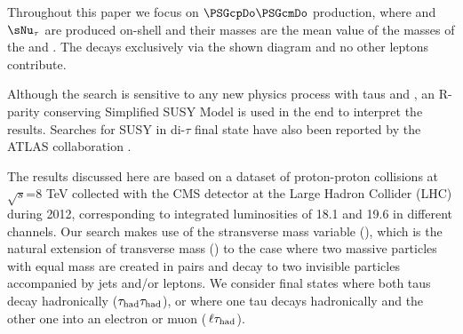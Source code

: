 Throughout this paper we focus on $\PSGcpDo\PSGcmDo$ production, where \sTau and $\sNu_{\tau}$ 
are produced  on-shell and their masses are the mean value of the masses of the \chione and \PSGczDo.
The \chione decays exclusively via the shown diagram and no other leptons contribute.

Although the search is sensitive to any 
new physics process with taus and \MET, an R-parity conserving Simplified SUSY Model \cite{Alwall:2008ag,alves:sms} is used 
in the end to interpret the results.
Searches for SUSY in di-$\tau$ final state have also been reported by the ATLAS collaboration \cite{Aad:2014yka}.


The results discussed here are based on a dataset of proton-proton 
collisions at $\sqrt{s}$=8 TeV
collected with the CMS detector at the Large Hadron Collider (LHC) during 2012, corresponding to integrated
luminosities of 18.1 and 19.6 \invfb in different channels. 
Our search makes use of the stransverse mass variable (\mttwo), 
which is the natural extension of transverse mass (\mt) to the case 
where two massive particles with equal mass are created in pairs and decay 
to two invisible particles accompanied by jets and/or leptons.  We consider final states where
both taus decay hadronically ($\tau_{\rm had} \tau_{\rm had}$), or where one tau decays hadronically and the
other one into an electron or muon ($\,\ell\tau_{\rm had}$).

